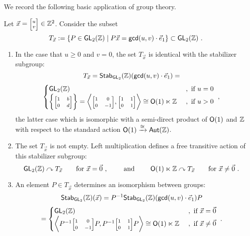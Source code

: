 We record the following basic application of group theory.
\begin{observation}
\label{q11}
Let $\vec{x} = \mbox{\scriptsize$\begin{bmatrix} u \\ v \end{bmatrix} $}\in \ZZ^2$.
Consider the subset \[T_{\vec{x}} := \left\{ P \in \operatorname{\sf GL}_2(\mathbb Z) \mid P \vec{x}= {\sf gcd}(u,v) \cdot \vec{e}_1 \right\}\subset \operatorname{\sf GL}_2(\mathbb Z)~.\]
\begin{enumerate}

\item
In the case that $u\geq 0$ and $v=0$, the set $T_{\vec{x}}$ is identical with the stabilizer subgroup:
\[
T_{\vec{x}}
=
{\sf Stab}_{\operatorname{\sf GL}_2}(\mathbb Z)( {\sf gcd}(u,v) \cdot \vec{e}_1 )
=
\]
\[
\begin{cases}
\GL_2(\ZZ)
&
~,
\text{ if } u=0
\\
\left\{ \mbox{\scriptsize$ \begin{bmatrix} 1 & b \\ 0 & d \end{bmatrix} $}\right\}
=
\left\lag  
\mbox{\scriptsize$
\begin{bmatrix}
1
&
0
\\
0
&
-1
\end{bmatrix} $}
,

\mbox{\scriptsize$\begin{bmatrix}
1
&
1
\\
0
&
1
\end{bmatrix} $}
\right\rag
\cong
\sO(1) \ltimes \ZZ
&
~,
\text{ if } u>0
\end{cases}
~,
\]
the latter case which is isomorphic with a semi-direct product of $\mathsf O(1)$ and $\mathbb Z$ with respect to the standard action $\mathsf O(1) \xrightarrow{\cong} \operatorname{\sf Aut}(\mathbb Z)$.




\item
The set $T_{\vec{x}}$ is not empty.
Left multiplication defines a free transitive action of this stabilizer subgroup:
\[
\operatorname{\sf GL}_2(\mathbb Z)
\curvearrowright
T_{\vec{x}}
\qquad 
\text{for $\vec{x}= \vec{0}$}
~,
\qquad
\text{ and }
\qquad
\mathsf O(1) \ltimes \mathbb Z
\curvearrowright
T_{\vec{x}}
\qquad 
\text{for $\vec{x}\neq \vec{0}$}
~.
\]

\item
An element $P \in T_{\vec{x}}$ determines an isomorphism between groups:
\[
{\sf Stab}_{\operatorname{\sf GL}_2}(\mathbb Z)(\vec{x}) 
=
P^{-1}
{\sf Stab}_{\operatorname{\sf GL}_2}(\mathbb Z)( {\sf gcd}(u,v) \cdot \vec{e}_1 )
P
\]
\[
=
\begin{cases}
\GL_2(\ZZ)
&
~,
\text{ if } \vec{x}= \vec{0}
\\
\left\lag  
P^{-1}
\mbox{\scriptsize$\begin{bmatrix}
1
&
0
\\
0
&
-1
\end{bmatrix} $}
P
,
P^{-1}
\mbox{\scriptsize$\begin{bmatrix}
1
&
1
\\
0
&
1
\end{bmatrix} $}
P
\right\rag
\cong
\sO(1) \ltimes \ZZ
&
~,
\text{ if } \vec{x}\neq \vec{0}
\end{cases}
~.
\]



\end{enumerate}
\end{observation}
